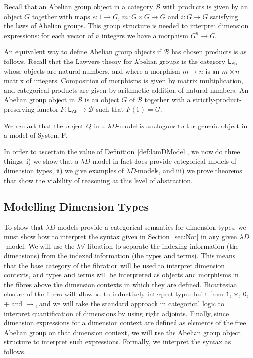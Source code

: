\documentclass[a4paper,UKenglish]{lipics}
\theoremstyle{plain}
\newcommand{\SystemF}{System F\xspace}
\newcommand{\msf}[1]{\mathsf{#1}} %
\newcommand{\LAb}{\msf{L}_{\msf{Ab}}}
\newcommand{\B}{\mathcal{B}}
\newcommand{\unitTy}{\msf{1}}
\newcommand{\emptyTy}{\msf{0}}
\begin{document}
Recall that an Abelian group object in a category $\B$ with products is given by an object $G$ together with maps $e:1\to G$, $m:G\times G\to G$ and $i:G\to G$ satisfying the laws of Abelian groups. This group structure is needed to interpret dimension expressions: for each vector of $n$ integers we have a morphism $G^n\to G$.

An equivalent way to define Abelian group objects if $\B$ has chosen products is as follows. Recall that the Lawvere theory for Abelian groups is the category $\LAb$ whose objects are natural numbers, and where a morphism $m\to n$ is an $m\times n$ matrix of integers. Composition of morphisms is given by matrix multiplication, and categorical products are given by arithmetic addition of natural numbers. An Abelian group object in $\B$ is an object $G$ of $\B$ together with a strictly-product-preserving functor $F:\LAb\to\B$ such that $F(1)=G$.

We remark that the object $Q$ in a $\lambda D$-model is analogous to the generic object in a model of \SystemF.

In order to ascertain the value of Definition~\ref{def:lamDModel}, we now do three things: i) we show that a $\lambda D$-model in fact does provide categorical models of dimension types, ii) we give examples of $\lambda D$-models, and iii) we prove theorems that show the viability of reasoning at this level of abstraction.





\subsection{Modelling Dimension Types}
\label{sec:Modelling-Dimensions}
To show that $\lambda D$-models provide a categorical semantics for dimension types, we must show how to interpret the syntax given in Section~\ref{sec:Not} in any given $\lambda D$-model. We will use the $\lambda \forall$-fibration to separate the indexing information (the dimensions) from the indexed information (the types and terms). This means that the base category of the fibration will be used to interpret dimension contexts, and types and terms will be interpreted as objects and morphisms in the fibres above the dimension contexts in which they are defined. Bicartesian closure of the fibres will allow us to inductively interpret types built from $\unitTy$, $\times$, $\emptyTy$, $+$ and $\rightarrow$, and we will take the standard approach in categorical logic to interpret quantification of dimensions by using right adjoints. Finally, since dimension expressions for a dimension context are defined as elements of the free Abelian group on that dimension context, we will use the Abelian group object
structure to interpret
such expressions. Formally, we interpret the syntax as follows.
\end{document}
